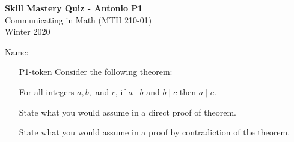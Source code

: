 \documentclass[10pt]{article}
\begin{document}
\vspace{-1.2in}
\begin{center} \textbf{\Large{Skill Mastery Quiz - Antonio P1}} \\
Communicating in Math (MTH 210-01)\\
Winter 2020
\end{center}



\noindent Name: 




\begin{itemize}
	
\item[P1-token] Consider the following theorem:
	\begin{center}
	For all integers $a,b,$ and $c$, if $a\mid b$ and $b\mid c$ then $a\mid c$.
	\end{center}
State what you would assume in a direct proof of theorem.



\vfill
State what you would assume in a proof by contradiction of the theorem.
 

\vfill

\end{itemize}
	
\end{document}
